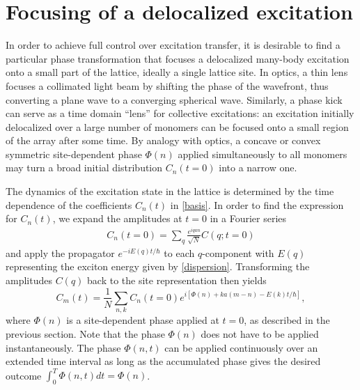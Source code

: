 \section{Focusing of a delocalized excitation}
\label{sec:focusing}

In order to achieve full control over excitation transfer, it is desirable to find a particular phase transformation
that focuses a delocalized many-body excitation onto a small part of the lattice, ideally a single lattice site.
In optics, a thin lens focuses a collimated light beam by shifting
the phase of the wavefront, thus converting a plane wave to a
converging spherical wave. Similarly, a phase kick can serve as a
time domain ``lens'' for collective excitations: an excitation initially
delocalized over a large number of monomers can be focused onto a
small region of the array after some time. By analogy with optics, a concave or convex
symmetric site-dependent phase $\Phi(n)$ applied simultaneously to
all monomers may turn a broad initial distribution $C_n(t=0)$ into
a narrow one.

The dynamics of the excitation state in the lattice is determined by the time dependence
of the coefficients $C_n(t)$ in  \autoref{basis}. In order to find the expression for $C_n(t)$, we expand the amplitudes
 at $t=0$ in a Fourier series
\begin{eqnarray}
C_n(t=0) = \sum_q
\frac{e^{iq a n}}{\sqrt{N}}C(q; t=0)
\end{eqnarray}
and apply the propagator $e^{-iE(q)t/\hbar}$ to each $q$-component with
$E(q)$ representing the exciton energy given by \autoref{dispersion}.
Transforming the amplitudes $C(q)$ back to the site representation then yields
\begin{equation}
C_m(t) = \frac{1}{N} \sum_{n,k} C_n(t=0) e^{i [\Phi(n) +  k a
(m-n) - E(k) t/\hbar ]},
 \label{Cn(t)}
\end{equation}
where $\Phi(n)$ is a
site-dependent phase applied at $t=0$, as described in the previous section.
Note that the phase $\Phi(n)$ does not have to be applied
instantaneously. The phase  $\Phi(n, t)$ can be applied continuously over an
extended time interval as long as the accumulated phase gives the desired outcome  $\int_0^{T}\Phi(n, t)dt = \Phi(n)$.


